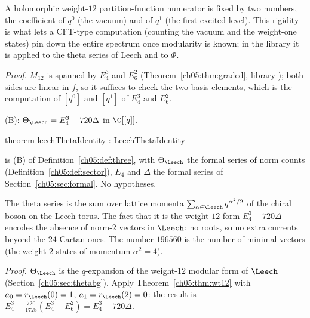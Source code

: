 \begin{physics}
A holomorphic weight-$12$ partition-function numerator is fixed by two numbers, the coefficient of $q^0$ (the vacuum) and of $q^1$ (the first excited level). This rigidity is what lets a CFT-type computation (counting the vacuum and the weight-one states) pin down the entire spectrum once modularity is known; in the library it is applied to the theta series of Leech and to $\Phi$.
\end{physics}
\noindent\emph{Proof.} $M_{12}$ is spanned by $E_4^3$ and $E_6^2$ (Theorem~\ref{ch05:thm:graded}, library
); both sides are linear in $f$, so it suffices to check the two basis
elements, which is the computation of $[q^0]$ and $[q^1]$ of $E_4^3$ and $E_6^2$.

\begin{theorem}\label{ch05:thm:leechtheta}
(B): $\Theta_\Leech = E_4^3 - 720\Delta$ in $\C[[q]]$.
\end{theorem}
\begin{leancode}
theorem leechThetaIdentity : LeechThetaIdentity
\end{leancode}
\begin{dictionary}
 is (B) of Definition~\ref{ch05:def:three}, with $\Theta_\Leech$ the formal series
 of norm counts (Definition~\ref{ch05:def:sector}), $E_4$ and $\Delta$ the formal series
of Section~\ref{ch05:sec:formal}. No hypotheses.
\end{dictionary}

\begin{physics}
The theta series is the sum over lattice momenta $\sum_{\alpha\in\Leech}q^{\alpha^2/2}$ of the chiral boson on the Leech torus. The fact that it is the weight-$12$ form $E_4^3-720\Delta$ encodes the absence of norm-$2$ vectors in $\Leech$: no roots, so no extra currents beyond the $24$ Cartan ones. The number $196560$ is the number of minimal vectors (the weight-$2$ states of momentum $\alpha^2=4$).
\end{physics}
\noindent\emph{Proof.} $\Theta_\Leech$ is the $q$-expansion of the weight-$12$ modular form
 of $\Leech$ (Section~\ref{ch05:sec:thetabg}). Apply Theorem~\ref{ch05:thm:wt12}
with $a_0 = r_\Leech(0) = 1$, $a_1 = r_\Leech(2) = 0$: the result is $E_4^3 - \frac{720}{1728}(E_4^3-E_6^2) = E_4^3
- 720\Delta$.

